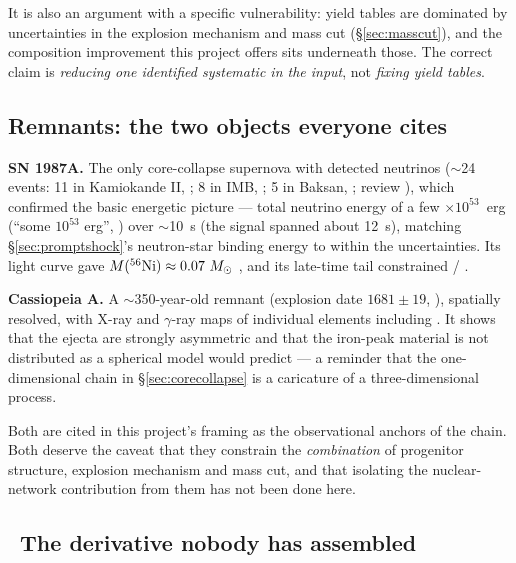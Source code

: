 It is also an argument with a specific vulnerability: yield tables are
dominated by uncertainties in the explosion mechanism and mass cut
(\S\ref{sec:masscut}), and the composition improvement this project offers sits
underneath those. The correct claim is \emph{reducing one identified systematic
in the input}, not \emph{fixing yield tables}.

\subsection{Remnants: the two objects everyone cites}
\label{sec:remnants}

\textbf{SN 1987A.} The only core-collapse supernova with detected neutrinos
($\sim$24 events: 11 in Kamiokande II, \citealt{hirata1987}; 8 in IMB,
\citealt{bionta1987}; 5 in Baksan, \citealt{alekseev1988}; review
\citealt{janka2017}), which confirmed the basic energetic picture --- total
neutrino energy of a few $\times 10^{53}$~erg (``some $10^{53}$ erg'',
\citealt{janka2017}) over $\sim$10~s (the signal spanned about 12~s), matching
\S\ref{sec:promptshock}'s neutron-star binding energy to within the
uncertainties. Its light curve gave $M(\nuc{Ni}{56}) \approx 0.07~\Msun$
,
and its late-time tail constrained /
\citep{seitenzahl2014}.

\textbf{Cassiopeia A.} A $\sim$350-year-old remnant (explosion date $1681 \pm
19$, \citealt{fesen2006}), spatially resolved, with X-ray and $\gamma$-ray maps
of individual elements including  \citep{grefenstette2014}. It
shows that the ejecta are strongly asymmetric \citep{milisavljevic2013,
grefenstette2014} and that the iron-peak material is not distributed as a
spherical model would predict --- a reminder that the one-dimensional chain in
\S\ref{sec:corecollapse} is a caricature of a three-dimensional process.

Both are cited in this project's framing as the observational anchors of the
\Ye{} chain. Both deserve the caveat that they constrain the \emph{combination}
of progenitor structure, explosion mechanism and mass cut, and that isolating
the nuclear-network contribution from them has not been done here.

\subsection{\texorpdfstring{\warnglyph{}~}{}The derivative nobody has assembled}
\label{sec:missingderivative}

